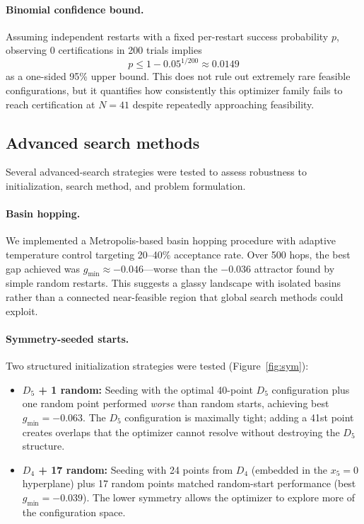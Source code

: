 \documentclass[11pt]{article}
\begin{document}
\paragraph{Binomial confidence bound.}
Assuming independent restarts with a fixed per-restart success probability $p$, observing 0 certifications in 200 trials implies
\[
p \le 1-0.05^{1/200}\approx 0.0149
\]
as a one-sided 95\% upper bound. This does not rule out extremely rare feasible configurations, but it quantifies how consistently this optimizer family fails to reach certification at $N=41$ despite repeatedly approaching feasibility.

\subsection{Advanced search methods}
\label{sec:advanced}
Several advanced-search strategies were tested to assess robustness to initialization, search method, and problem formulation.

\paragraph{Basin hopping.}
We implemented a Metropolis-based basin hopping procedure with adaptive temperature control targeting 20--40\% acceptance rate. Over 500 hops, the best gap achieved was $g_{\min}\approx -0.046$---worse than the $-0.036$ attractor found by simple random restarts. This suggests a glassy landscape with isolated basins rather than a connected near-feasible region that global search methods could exploit.

\paragraph{Symmetry-seeded starts.}
Two structured initialization strategies were tested (Figure~\ref{fig:sym}):
\begin{itemize}
\item \textbf{$D_5$ + 1 random:} Seeding with the optimal 40-point $D_5$ configuration plus one random point performed \emph{worse} than random starts, achieving best $g_{\min}=-0.063$. The $D_5$ configuration is maximally tight; adding a 41st point creates overlaps that the optimizer cannot resolve without destroying the $D_5$ structure.
\item \textbf{$D_4$ + 17 random:} Seeding with 24 points from $D_4$ (embedded in the $x_5=0$ hyperplane) plus 17 random points matched random-start performance (best $g_{\min}=-0.039$). The lower symmetry allows the optimizer to explore more of the configuration space.
\end{itemize}
\end{document}
